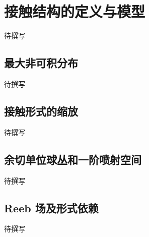 
% 
% 

\section{接触结构的定义与模型}
\label{g4:sec:1301}

待撰写

\subsection{最大非可积分布}
\label{g4:subsec:1301:01}
待撰写

\subsection{接触形式的缩放}
\label{g4:subsec:1301:02}
待撰写

\subsection{余切单位球丛和一阶喷射空间}
\label{g4:subsec:1301:03}
待撰写

\subsection{Reeb 场及形式依赖}
\label{g4:subsec:1301:04}
待撰写
